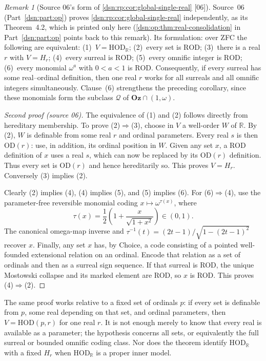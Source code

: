 \documentclass[11pt,a4paper]{article}
\numberwithin{equation}{section}
\theoremstyle{definition}
\theoremstyle{remark}
\newtheorem{remark}[remark]{Remark}
\newcommand{\Oz}{\mathbf{Oz}}
\newcommand{\OD}{\mathrm{OD}}
\newcommand{\HOD}{\mathrm{HOD}}
\newcommand{\R}{\mathbb R}
\newcommand{\src}[1]{\textup{\textsf{\small[#1]}}}
\newcommand{\ROD}{\mathrm{ROD}}
\newcommand{\HR}{\HOD_{\R}}
\newcommand{\Qrange}{\mathcal Q}
\begin{document}
\begin{remark}[Source 06's form of \cref{dsn:rp:cor:global-single-real} \src{06}]
\label{dsn:rp:rem:consolidation06}
Source~06 (Part~\ref{dsn:part:op}) proves \cref{dsn:rp:cor:global-single-real}
independently, as its Theorem~4.2, which is printed only here
(\cref{dsn:op:thm:real-consolidation} in Part~\ref{dsn:part:op} points back to
this remark). Its formulation: over ZFC the following are equivalent:
(1)~$V=\HR$; (2)~every set is $\ROD$; (3)~there is a real $r$ with $V=H_r$;
(4)~every surreal is $\ROD$; (5)~every omnific integer is $\ROD$;
(6)~every monomial $\omega^a$ with $0<a<1$ is $\ROD$. Consequently, if every
surreal has some real--ordinal definition, then one real $r$ works for all
surreals and all omnific integers simultaneously. Clause~(6) strengthens
the preceding corollary, since these monomials form the subclass $\Qrange$ of
$\Oz\cap(1,\omega)$.
\end{remark}
\begin{proof}[Second proof (source 06)]
The equivalence of (1) and (2) follows directly from hereditary
membership.  To prove (2)$\Rightarrow$(3), choose in $V$ a well-order $W$
of $\R$.  By (2), $W$ is definable from some real $r$ and ordinal
parameters.  Every real $s$ is then $\OD(r)$: use, in addition, its
ordinal position in $W$.  Given any set $x$, a ROD definition of $x$
uses a real $s$, which can now be replaced by its $\OD(r)$ definition.
Thus every set is $\OD(r)$ and hence hereditarily so.  This proves
$V=H_r$.  Conversely (3) implies (2).

Clearly (2) implies (4), (4) implies (5), and (5) implies (6).
For (6)$\Rightarrow$(4), use the parameter-free reversible monomial
coding $x\mapsto\omega^{\tau(x)}$, where
\[
 \tau(x)=\frac12\left(1+\frac{x}{\sqrt{1+x^2}}\right)\in(0,1).
\]
The canonical omega-map inverse and
$\tau^{-1}(t)=(2t-1)/\sqrt{1-(2t-1)^2}$ recover $x$.
Finally, any set $x$ has, by Choice, a code consisting of a pointed
well-founded extensional relation on an ordinal.  Encode that relation
as a set of ordinals and then as a surreal sign sequence.  If that
surreal is ROD, the unique Mostowski collapse and its marked element
are ROD, so $x$ is ROD.  This proves (4)$\Rightarrow$(2).
\end{proof}
The same proof works relative to a fixed set of ordinals $p$: if every
set is definable from $p$, some real depending on that set, and ordinal
parameters, then $V=\HOD(p,r)$ for one real $r$.  It is not enough merely
to know that every real is available as a parameter; the hypothesis
concerns all sets, or equivalently the full surreal or bounded omnific
coding class.  Nor does the theorem identify $\HOD_{\R}$ with a fixed
$H_r$ when $\HOD_{\R}$ is a proper inner model.
\end{document}
